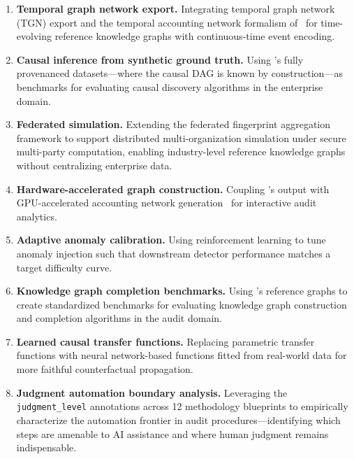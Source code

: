 \begin{enumerate}
  \item \textbf{Temporal graph network export.}  Integrating temporal
    graph network (TGN) export and the temporal accounting network
    formalism of~\citet{ivertowski2024temporal} for time-evolving
    reference knowledge graphs with continuous-time event encoding.

  \item \textbf{Causal inference from synthetic ground truth.}  Using
    \system{}'s fully provenanced datasets---where the causal DAG is
    known by construction---as benchmarks for evaluating causal
    discovery algorithms in the enterprise domain.

  \item \textbf{Federated simulation.}  Extending the federated
    fingerprint aggregation framework to support distributed
    multi-organization simulation under secure multi-party computation,
    enabling industry-level reference knowledge graphs without
    centralizing enterprise data.

  \item \textbf{Hardware-accelerated graph construction.}  Coupling
    \system{}'s output with GPU-accelerated accounting network
    generation~\citep{ivertowski2024hardware} for interactive audit
    analytics.

  \item \textbf{Adaptive anomaly calibration.}  Using reinforcement
    learning to tune anomaly injection such that downstream detector
    performance matches a target difficulty curve.

  \item \textbf{Knowledge graph completion benchmarks.}  Using
    \system{}'s reference graphs to create standardized benchmarks for
    evaluating knowledge graph construction and completion algorithms
    in the audit domain.

  \item \textbf{Learned causal transfer functions.}  Replacing
    parametric transfer functions with neural network-based functions
    fitted from real-world data for more faithful counterfactual
    propagation.

  \item \textbf{Judgment automation boundary analysis.}  Leveraging
    the \texttt{judgment\_level} annotations across 12 methodology
    blueprints to empirically characterize the automation frontier in
    audit procedures---identifying which steps are amenable to AI
    assistance and where human judgment remains indispensable.
\end{enumerate}

